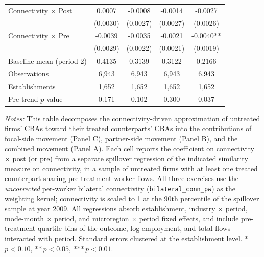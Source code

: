 \begin{table}[H]
\begin{tabular}{lcccc}
Connectivity $\times$ Post & 0.0007 & -0.0008 & -0.0014 & -0.0027 \\
 & (0.0030) & (0.0027) & (0.0027) & (0.0026) \\
Connectivity $\times$ Pre & -0.0039 & -0.0035 & -0.0021 & -0.0040** \\
 & (0.0029) & (0.0022) & (0.0021) & (0.0019) \\
Baseline mean (period 2) & 0.4135 & 0.3139 & 0.3122 & 0.2166 \\
Observations &        6,943 &        6,943 &        6,943 &        6,943 \\
Establishments &        1,652 &        1,652 &        1,652 &        1,652 \\
Pre-trend $p$-value & 0.171 & 0.102 & 0.300 & 0.037 \\
\hline
\hline\hline
\end{tabular}
\begin{minipage}{\linewidth}
\smallskip
\scriptsize\textit{Notes:} This table decomposes the connectivity-driven approximation of untreated firms' CBAs toward their treated counterparts' CBAs into the contributions of focal-side movement (Panel C), partner-side movement (Panel B), and the combined movement (Panel A). Each cell reports the coefficient on connectivity $\times$ post (or pre) from a separate spillover regression of the indicated similarity measure on connectivity, in a sample of untreated firms with at least one treated counterpart sharing pre-treatment worker flows. All three exercises use the \emph{uncorrected} per-worker bilateral connectivity (\texttt{bilateral\_conn\_pw}) as the weighting kernel; connectivity is scaled to 1 at the 90th percentile of the spillover sample at year 2009. All regressions absorb establishment, industry $\times$ period, mode-month $\times$ period, and microregion $\times$ period fixed effects, and include pre-treatment quartile bins of the outcome, log employment, and total flows interacted with period. Standard errors clustered at the establishment level. *\,$p<0.10$, **\,$p<0.05$, ***\,$p<0.01$.
\end{minipage}
\end{table}
